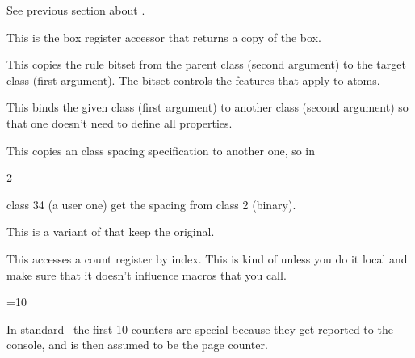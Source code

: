 \stopnewprimitive

\startnewprimitive[title={\prm {constrained}}]

See previous section about .

\stopnewprimitive

\startoldprimitive[title={\prm {copy}}]

This is the box register accessor that returns a copy of the box.

\stopoldprimitive

\startnewprimitive[title={\prm {copymathatomrule}}]

This copies the rule bitset from the parent class (second argument) to the target
class (first argument). The bitset controls the features that apply to atoms.

\stopnewprimitive

\startnewprimitive[title={\prm {copymathparent}}]

This binds the given class (first argument) to another class (second argument) so
that one doesn't need to define all properties.

\stopnewprimitive

\startnewprimitive[title={\prm {copymathspacing}}]

This copies an class spacing specification to another one, so in

\starttyping
{} 2
\stoptyping

class 34 (a user one) get the spacing from class 2 (binary).

\stopnewprimitive

\startnewprimitive[title={\prm {copysplitdiscards}}]

This is a variant of  that keep the original.

\stopnewprimitive

\startoldprimitive[title={\prm {count}}]

This accesses a count register by index. This is kind of  unless
you do it local and make sure that it doesn't influence macros that you call.

\starttyping
{}=10
\stoptyping

In standard \TEX\ the first 10 counters are special because they get reported to
the console, and  is then assumed to be the page counter.

\stopoldprimitive

\startoldprimitive[title={\prm {countdef}}]

